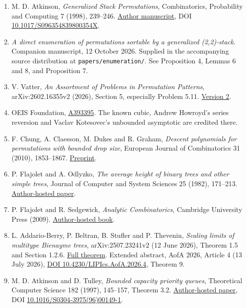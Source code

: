 \documentclass[11pt,letterpaper]{article}
\begin{document}
\begin{enumerate}
\def\labelenumi{\arabic{enumi}.}
\item
  M. D. Atkinson, \emph{Generalized Stack Permutations}, Combinatorics,
  Probability and Computing 7 (1998), 239--246.
  \href{https://www.cs.otago.ac.nz/staffpriv/mike/Papers/Genstack/Genstack.pdf}{Author
  manuscript}, DOI
  \href{https://doi.org/10.1017/S096354839800354X}{10.1017/S096354839800354X}.
\item
  \emph{A direct enumeration of permutations sortable by a generalized
  (2,2)-stack}. Companion manuscript, 12 October 2026. Supplied in the
  accompanying source distribution at \texttt{papers/enumeration/}.
  See Proposition 4, Lemmas 6 and 8, and Proposition 7.
\item
  V. Vatter, \emph{An Assortment of Problems in Permutation Patterns},
  arXiv:2602.16355v2 (2026), Section 5, especially Problem 5.11.
  \href{https://arxiv.org/html/2602.16355v2}{Version 2}.
\item
  OEIS Foundation, \href{https://oeis.org/A393395}{A393395}. The known
  cubic, Andrew Howroyd's series reversion and Vaclav Kotesovec's
  unbounded asymptotic are credited there.
\item
  F. Chung, A. Claesson, M. Dukes and R. Graham, \emph{Descent
  polynomials for permutations with bounded drop size}, European Journal
  of Combinatorics 31 (2010), 1853--1867.
  \href{https://arxiv.org/abs/0908.2456}{Preprint}.
\item
  P. Flajolet and A. Odlyzko, \emph{The average height of binary trees
  and other simple trees}, Journal of Computer and System Sciences 25
  (1982), 171--213.
  \href{https://algo.inria.fr/flajolet/Publications/FlOd82height.pdf}{Author-hosted
  paper}.
\item
  P. Flajolet and R. Sedgewick, \emph{Analytic Combinatorics}, Cambridge
  University Press (2009).
  \href{https://algo.inria.fr/flajolet/Publications/book.pdf}{Author-hosted
  book}.
\item
  L. Addario-Berry, P. Beltran, B. Stufler and P. Thevenin,
  \emph{Scaling limits of multitype Bienayme trees}, arXiv:2507.23241v2
  (12 June 2026), Theorem 1.5 and Section 1.2.6.
  \href{https://arxiv.org/html/2507.23241v2\#S1.SS4}{Full theorem}.
  Extended abstract, AofA 2026, Article 4 (13 July 2026),
  \href{https://doi.org/10.4230/LIPIcs.AofA.2026.4}{DOI
  10.4230/LIPIcs.AofA.2026.4}, Theorem 9.
\item
  M. D. Atkinson and D. Tulley, \emph{Bounded capacity priority queues},
  Theoretical Computer Science 182 (1997), 145--157, Theorem 3.2.
  \href{https://www.cs.otago.ac.nz/staffpriv/mike/Papers/PriorityQueues/BoundedPQs.pdf}{Author-hosted
  paper}, DOI
  \href{https://doi.org/10.1016/S0304-3975(96)00149-1}{10.1016/S0304-3975(96)00149-1}.
\end{enumerate}
\end{document}
